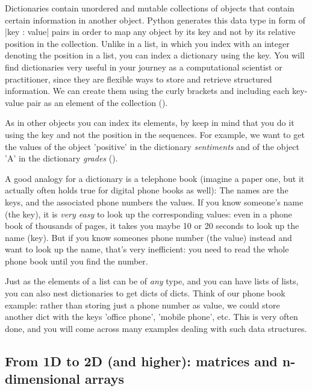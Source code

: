 Dictionaries contain unordered and mutable collections of objects that
contain certain information in another object. Python generates this
data type in form of |{key : value}| pairs in order
to map any object by its key and not by its relative position in the
collection. Unlike in a list, in which you index with an integer denoting
the position in a list, you can index a dictionary using the key. You will
find dictionaries very useful in your journey as a computational
scientist or practitioner, since they are flexible ways to store and
retrieve structured information. We can create them using the curly
brackets {} and including each key-value pair as an element of the
collection ().



As in other objects you can index its elements, by keep in mind that
you do it using the key and not the position in the sequences. For
example, we want to get the values of the object 'positive' in the
dictionary \emph{sentiments} and of the object 'A' in the dictionary
\emph{grades} ().

A good analogy for a dictionary is a telephone book (imagine a paper
one, but it actually often holds true for digital phone books as
well): The names are the keys, and the associated phone numbers the
values. If you know someone's name (the key), it is \emph{very easy}
to look up the corresponding values: even in a phone book of thousands
of pages, it takes you maybe 10 or 20 seconds to look up the name
(key). But if you know someones phone number (the value) instead and
want to look up the name, that's very inefficient: you need to read
the whole phone book until you find the number.

Just as the elements of a list can be of \emph{any} type, and you can
have lists of lists, you can also nest dictionaries to get dicts of
dicts. Think of our phone book example: rather than storing just a
phone number as value, we could store another dict with the keys
'office phone', 'mobile phone', etc. This is very often done, and you
will come across many examples dealing with such data structures.




\subsection{From 1D to 2D (and higher): matrices and n-dimensional arrays}

